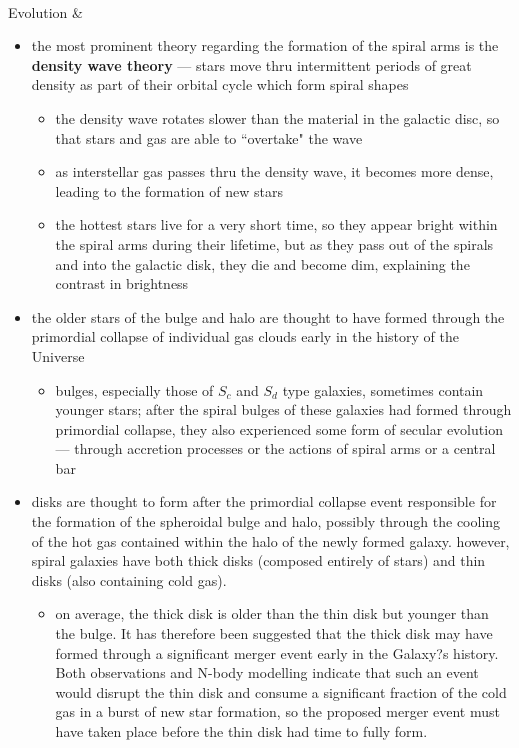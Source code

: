 \begin{longtabu}
\begin{itemize}[noitemsep]
\begin{itemize}[noitemsep]
			\end{itemize}
	\end{itemize}
	\\
	\hline
	Evolution &
	\begin{itemize}[noitemsep]
		\item the most prominent theory regarding the formation of the spiral arms is the \textbf{density wave theory} --- stars move thru intermittent periods of great density as part of their orbital cycle which form spiral shapes
			\begin{itemize}[noitemsep]
				\item the density wave rotates slower than the material in the galactic disc, so that stars and gas are able to ``overtake" the wave
				\item as interstellar gas passes thru the density wave, it becomes more dense, leading to the formation of new stars
				\item the hottest stars live for a very short time, so they appear bright within the spiral arms during their lifetime, but as they pass out of the spirals and into the galactic disk, they die and become dim, explaining the contrast in brightness
			\end{itemize}
		\item the older stars of the bulge and halo are thought to have formed through the primordial collapse of individual gas clouds early in the history of the Universe
			\begin{itemize}[noitemsep]
				\item bulges, especially those of $S_c$ and $S_d$ type galaxies, sometimes contain younger stars; after the spiral bulges of these galaxies had formed through primordial collapse, they also experienced some form of secular evolution --- through accretion processes or the actions of spiral arms or a central bar
			\end{itemize}
		\item disks are thought to form after the primordial collapse event responsible for the formation of the spheroidal bulge and halo, possibly through the cooling of the hot gas contained within the halo of the newly formed galaxy. however, spiral galaxies have both thick disks (composed entirely of stars) and thin disks (also containing cold gas).
			\begin{itemize}[noitemsep]
				\item on average, the thick disk is older than the thin disk but younger than the bulge. It has therefore been suggested that the thick disk may have formed through a significant merger event early in the Galaxy?s history. Both observations and N-body modelling indicate that such an event would disrupt the thin disk and consume a significant fraction of the cold gas in a burst of new star formation, so the proposed merger event must have taken place before the thin disk had time to fully form.

\end{itemize}
\end{itemize}
\end{longtabu}
